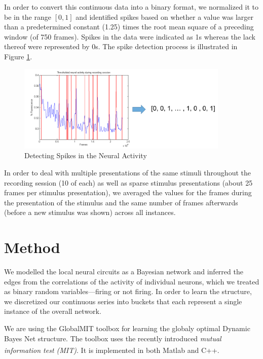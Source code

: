 \documentclass{article}
\begin{document}
In order to convert this continuous data into a binary format, we normalized 
it to be in the range $[0, 1]$ and identified spikes based on whether a value 
was larger than a predetermined constant (1.25) times the root mean square of 
a preceding window (of 750 frames). Spikes in the data were indicated as 1s 
whereas the lack thereof were represented by 0s. The spike detection process 
is illustrated in Figure \ref{fig:spikes}.

\begin{figure}[ht]
  \centering

  \includegraphics[width=0.9\textwidth]{detecting_spikes}
  \caption{Detecting Spikes in the Neural Activity}
  \label{fig:spikes}
\end{figure}

In order to deal with multiple presentations of the same stimuli throughout 
the recording session (10 of each) as well as sparse stimulus presentations 
(about 25 frames per stimulus presentation), we averaged the values for the 
frames during the presentation of the stimulus and the same number of frames 
afterwards (before a new stimulus was shown) across all instances. \par

\section{Method}

We modelled the local neural circuits as a Bayesian network and inferred 
the edges from the correlations of the activity of individual neurons, which 
we treated as binary random variables—firing or not firing. In order to 
learn the structure, we discretized our continuous series into buckets 
that each represent a single instance of the overall network. \par

We are using the GlobalMIT toolbox for learning the globaly optimal Dynamic 
Bayes Net structure.\cite{globalmit} The toolbox uses the recently introduced 
\emph{mutual information test (MIT)}. It is implemented in both 
Matlab\textsuperscript{\textregistered} and C++. \par
\end{document}
